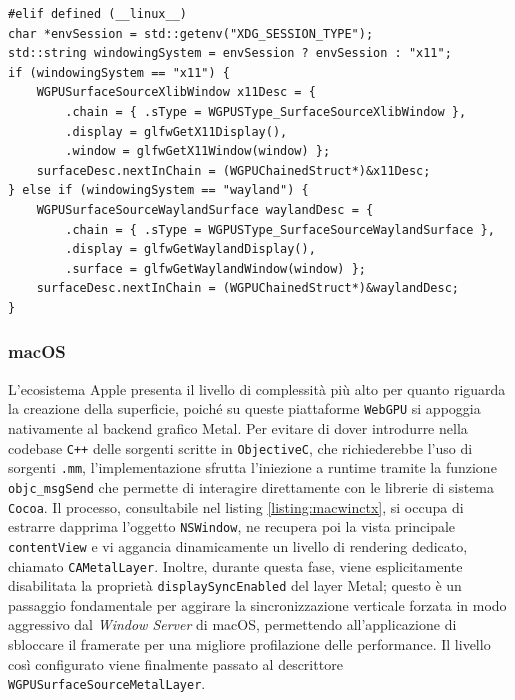 \documentclass[a4paper, 11pt, twoside]{report}
\begin{document}
\begin{listing}[!ht]
\begin{verbatim}
#elif defined (__linux__)
char *envSession = std::getenv("XDG_SESSION_TYPE");
std::string windowingSystem = envSession ? envSession : "x11";
if (windowingSystem == "x11") {
    WGPUSurfaceSourceXlibWindow x11Desc = {
        .chain = { .sType = WGPUSType_SurfaceSourceXlibWindow },
        .display = glfwGetX11Display(),
        .window = glfwGetX11Window(window) };
    surfaceDesc.nextInChain = (WGPUChainedStruct*)&x11Desc;
} else if (windowingSystem == "wayland") {
    WGPUSurfaceSourceWaylandSurface waylandDesc = {
        .chain = { .sType = WGPUSType_SurfaceSourceWaylandSurface },
        .display = glfwGetWaylandDisplay(),
        .surface = glfwGetWaylandWindow(window) };
    surfaceDesc.nextInChain = (WGPUChainedStruct*)&waylandDesc;
}
\end{verbatim}
\vspace{-0.75cm}
\caption{Inizializzazione contesto finestra (Linux Wayland/X11)}
\label{listing:linwinctx}
\end{listing}
\vspace{-0.75cm}

\pagebreak

\subsubsection{macOS}

L'ecosistema Apple presenta il livello di complessità più alto per quanto riguarda la creazione della superficie,
poiché su queste piattaforme \texttt{WebGPU} si appoggia nativamente al backend grafico \gls{Metal}.
Per evitare di dover introdurre nella codebase \texttt{C++} delle sorgenti scritte in \texttt{ObjectiveC}, che
richiederebbe l'uso di sorgenti \texttt{.mm}, l'implementazione sfrutta l'iniezione a runtime tramite la funzione
\texttt{objc\_msgSend} che permette di interagire direttamente con le librerie di sistema \texttt{Cocoa}.
Il processo, consultabile nel listing \ref{listing:macwinctx}, si occupa di estrarre dapprima l'oggetto
\texttt{NSWindow}, ne recupera poi la vista principale \texttt{contentView} e vi aggancia dinamicamente un livello di
rendering dedicato, chiamato \texttt{CAMetalLayer}.
Inoltre, durante questa fase, viene esplicitamente disabilitata la proprietà \texttt{displaySyncEnabled} del layer
\gls{Metal}; questo è un passaggio fondamentale per aggirare la sincronizzazione verticale forzata in modo aggressivo
dal \textit{Window Server} di macOS, permettendo all'applicazione di sbloccare il \gls{framerate} per una migliore
profilazione delle performance.
Il livello così configurato viene finalmente passato al descrittore \texttt{WGPUSurfaceSourceMetalLayer}.
\end{document}
